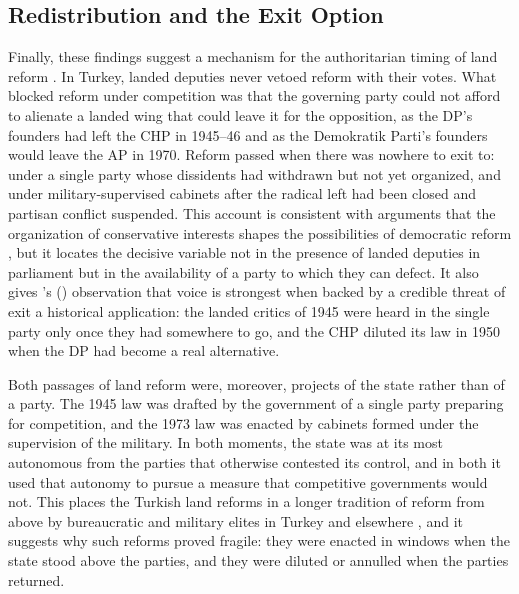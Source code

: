 \documentclass[12pt]{article}
\begin{document}
\subsection*{Redistribution and the Exit Option}

Finally, these findings suggest a mechanism for the authoritarian timing of land reform \citep{huntington1968,albertus2015}. In Turkey, landed deputies never vetoed reform with their votes. What blocked reform under competition was that the governing party could not afford to alienate a landed wing that could leave it for the opposition, as the DP's founders had left the CHP in 1945--46 and as the Demokratik Parti's founders would leave the AP in 1970. Reform passed when there was nowhere to exit to: under a single party whose dissidents had withdrawn but not yet organized, and under military-supervised cabinets after the radical left had been closed and partisan conflict suspended. This account is consistent with arguments that the organization of conservative interests shapes the possibilities of democratic reform \citep{ziblatt2017}, but it locates the decisive variable not in the presence of landed deputies in parliament but in the availability of a party to which they can defect. It also gives \citeauthor{hirschman1970}'s (\citeyear{hirschman1970}) observation that voice is strongest when backed by a credible threat of exit a historical application: the landed critics of 1945 were heard in the single party only once they had somewhere to go, and the CHP diluted its law in 1950 when the DP had become a real alternative.

Both passages of land reform were, moreover, projects of the state rather than of a party. The 1945 law was drafted by the government of a single party preparing for competition, and the 1973 law was enacted by cabinets formed under the supervision of the military. In both moments, the state was at its most autonomous from the parties that otherwise contested its control, and in both it used that autonomy to pursue a measure that competitive governments would not. This places the Turkish land reforms in a longer tradition of reform from above by bureaucratic and military elites in Turkey and elsewhere \citep{trimberger1978}, and it suggests why such reforms proved fragile: they were enacted in windows when the state stood above the parties, and they were diluted or annulled when the parties returned.
\end{document}
